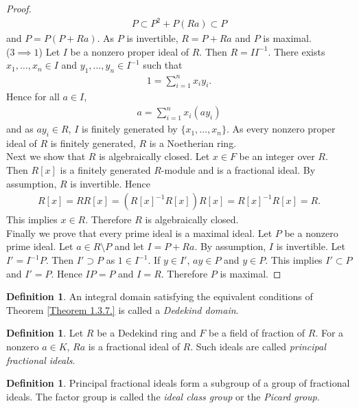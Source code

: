 \documentclass[12pt]{article}
\theoremstyle{plain}
\theoremstyle{remark}
\theoremstyle{definition}
\newtheorem{definition}[theorem]{Definition}
\begin{document}
\begin{proof}
    \begin{align*}
        P\subset P^2+P(Ra)\subset P
    \end{align*}
    and $P=P(P+Ra)$. As $P$ is invertible, $R=P+Ra$ and $P$ is maximal. \\
    ($3\implies 1$) Let $I$ be a nonzero proper ideal of $R$. Then $R=II^{-1}$. There exists $x_1,\dots,x_n\in I$ and $y_1,\dots,y_n\in I^{-1}$ such that
    \begin{align*}
        1=\sum_{i=1}^n x_i y_i.
    \end{align*}
    Hence for all $a\in I$,
    \begin{align*}
        a = \sum_{i=1}^n x_i(ay_i)
    \end{align*}
    and as $ay_i\in R$, $I$ is finitely generated by $\{x_1,\dots,x_n\}$. As every nonzero proper ideal of $R$ is finitely generated, $R$ is a Noetherian ring. \\
    Next we show that $R$ is algebraically closed. Let $x\in F$ be an integer over $R$. Then $R[x]$ is a finitely generated $R$-module and is a fractional ideal. By assumption, $R$ is invertible. Hence
    \begin{align*}
        R[x] = RR[x] = (R[x]^{-1}R[x])R[x] = R[x]^{-1}R[x] = R.
    \end{align*}
    This implies $x\in R$. Therefore $R$ is algebraically closed.\\
    Finally we prove that every prime ideal is a maximal ideal. Let $P$ be a nonzero prime ideal. Let $a\in R\setminus P$ and let $I=P+Ra$. By assumption, $I$ is invertible. Let $I'=I^{-1}P$. Then $I'\supset P$ as $1\in I^{-1}$. If $y\in I'$, $ay\in P$ and $y\in P$. This implies $I'\subset P$ and $I'=P$. Hence $IP=P$ and $I=R$. Therefore $P$ is maximal.
\end{proof}

\begin{definition}
    An integral domain satisfying the equivalent conditions of Theorem \ref{Theorem 1.3.7.} is called a \emph{Dedekind domain}.
\end{definition}

\begin{definition}
    Let $R$ be a Dedekind ring and $F$ be a field of fraction of $R$. For a nonzero $a\in K$, $Ra$ is a fractional ideal of $R$. Such ideals are called \emph{principal fractional ideals}.
\end{definition}

\begin{definition}
    Principal fractional ideals form a subgroup of a group of fractional ideals. The factor group is called the \emph{ideal class group} or the \emph{Picard group}.
\end{definition}
\end{document}
